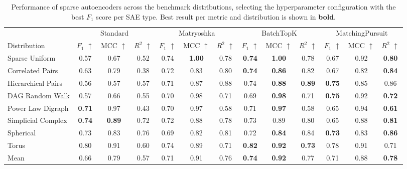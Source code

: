 \begin{table}[t]
  \centering

  \small
  \setlength{\tabcolsep}{4pt}

  \begin{tabular}{
      l
      ccc
      ccc
      ccc
      ccc
    }
    \toprule

    & \multicolumn{3}{c}{Standard}
    & \multicolumn{3}{c}{Matryoshka}
    & \multicolumn{3}{c}{BatchTopK}
    & \multicolumn{3}{c}{MatchingPursuit} \\

    \cmidrule(lr){2-4} \cmidrule(lr){5-7} \cmidrule(lr){8-10} \cmidrule(lr){11-13}

    Distribution
    & $F_1$ $\uparrow$ & MCC $\uparrow$ & $R^2$ $\uparrow$
    & $F_1$ $\uparrow$ & MCC $\uparrow$ & $R^2$ $\uparrow$
    & $F_1$ $\uparrow$ & MCC $\uparrow$ & $R^2$ $\uparrow$
    & $F_1$ $\uparrow$ & MCC $\uparrow$ & $R^2$ $\uparrow$\\

    \midrule

    Sparse Uniform       & 0.57 & 0.67 & 0.52 & 0.74 & \textbf{1.00} & 0.78 & \textbf{0.74} & \textbf{1.00} & 0.78 & 0.67 & 0.92 & \textbf{0.80} \\
    Correlated Pairs     & 0.63 & 0.79 & 0.38 & 0.72 & 0.83 & 0.80 & \textbf{0.74} & \textbf{0.86} & 0.82 & 0.67 & 0.82 & \textbf{0.84} \\
    Hierarchical Pairs   & 0.56 & 0.57 & 0.57 & 0.71 & 0.87 & 0.88 & 0.74 & \textbf{0.88} & \textbf{0.89} & \textbf{0.75} & 0.85 & 0.86 \\
    DAG Random Walk      & 0.57 & 0.66 & 0.55 & 0.70 & 0.98 & 0.71 & 0.69 & \textbf{0.98} & 0.71 & \textbf{0.75} & 0.92 & \textbf{0.72} \\
    Power Law Digraph    & \textbf{0.71} & 0.97 & 0.43 & 0.70 & 0.97 & 0.58 & 0.71 & \textbf{0.97} & 0.58 & 0.65 & 0.94 & \textbf{0.61} \\
    Simplicial Complex   & \textbf{0.74} & \textbf{0.89} & 0.72 & 0.72 & 0.88 & 0.78 & 0.73 & 0.89 & 0.80 & 0.65 & 0.88 & \textbf{0.81} \\
    Spherical            & 0.73 & 0.83 & 0.76 & 0.69 & 0.82 & 0.81 & 0.72 & \textbf{0.84} & 0.84 & \textbf{0.73} & 0.83 & \textbf{0.86} \\
    Torus                & 0.80 & 0.91 & 0.60 & 0.74 & 0.89 & 0.71 & \textbf{0.82} & \textbf{0.92} & \textbf{0.73} & 0.78 & 0.91 & 0.71 \\

    \midrule

    Mean                 & 0.66 & 0.79 & 0.57 & 0.71 & 0.91 & 0.76 & \textbf{0.74} & \textbf{0.92} & 0.77 & 0.71 & 0.88 & \textbf{0.78} \\

    \bottomrule
  \end{tabular}
  \caption{%
    Performance of sparse autoencoders across the benchmark distributions,
    selecting the hyperparameter configuration with the best $F_1$ score per SAE type.
    Best result per metric and distribution is shown in \textbf{bold}.
  }
  \label{tab:results-best-f1}

\end{table}
